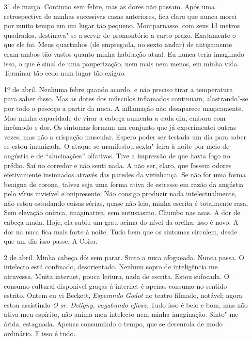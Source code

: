 31 de março. Continuo sem febre, mas as dores não passam. Após uma
retrospectiva de minhas sucessivas casas anteriores, fica claro que
nunca morei por muito tempo em um lugar tão pequeno. Montparnasse, com
seus 13 metros quadrados, destinava"-se a servir de promontório a curto
prazo. Exatamente o que ele foi. Meus quartinhos (de empregada, no sexto
andar) de antigamente eram ambos tão vastos quanto minha habitação
atual. Eu nunca teria imaginado isso, o que é sinal de uma pauperização,
nem mais nem menos, em minha vida. Terminar tão cedo num lugar tão
exíguo.

1º de abril. Nenhuma febre quando acordo, e não preciso tirar a
temperatura para saber disso. Mas as dores dos músculos inflamados
continuam, alastrando"-se por todo o pescoço a partir da nuca. A
inflamação não desaparece magicamente. Mas minha capacidade de virar a
cabeça aumenta a cada dia, embora com incômodo e dor. Os sintomas formam
um conjunto que já experimentei outras vezes, mas não a crispação
muscular. Espero poder ser testada um dia para saber se estou imunizada.
O ataque se manifestou sexta"-feira à noite por meio de angústia e de
``alucinações'' olfativas. Tive a impressão de que havia fogo no prédio.
Saí no corredor e não senti nada. A não ser, claro, que fossem odores
efetivamente insinuados através das paredes da vizinhança. Se não for
uma forma benigna de corona, talvez seja uma forma ativa de estresse em
razão da angústia pelo vírus invisível e onipresente. Não consigo
produzir nada intelectualmente, não estou estudando coisas sérias, quase
não leio, minha escrita é totalmente rasa. Sem elevação onírica,
imaginativa, sem entusiasmo. Chumbo nas asas. A dor de cabeça muda.
Hoje, ela subiu um grau acima do nível da orelha; isso é novo. A dor na
nuca fica mais forte à noite. Tudo bem que os sintomas circulem, desde
que um dia isso passe. A Coisa.

2 de abril. Minha cabeça dói sem parar. Sinto a nuca afogueada. Nunca
passa. O intelecto está confinado, desorientado. Nenhum sopro de
inteligência me atravessa. Muita internet, pouca leitura, nada de
escrita. Estou sufocada. O consumo cultural disponível graças à internet
é apenas consumo no sentido estrito. Ontem eu vi Beckett,
\emph{Esperando Godot} no teatro filmado, notável; agora estou
assistindo \emph{O sr. Deligny, vagabundo eficaz}. Tudo isso é belo e
bom, mas não ativa meu espírito, não anima meu intelecto nem minha
imaginação. Sinto"-me árida, estagnada. Apenas consumindo o tempo, que se
desenrola de modo ordinário. E isso é tudo.

